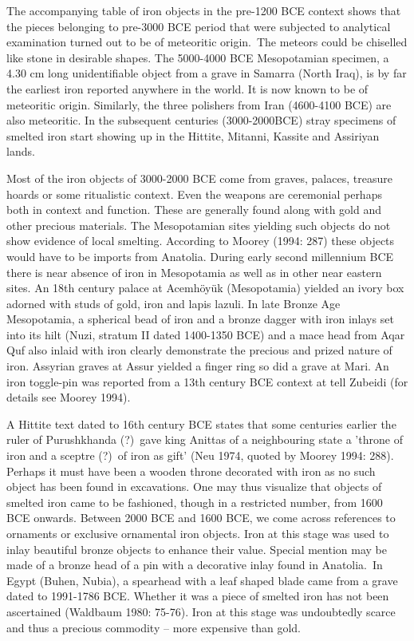 {The accompanying table of iron objects in the pre-1200 BCE context shows that the pieces belonging to pre-3000 BCE period that were subjected to analytical examination turned out to be of meteoritic origin.~The meteors could be chiselled like stone in desirable shapes. The 5000-4000 BCE Mesopotamian specimen, a 4.30 cm long unidentifiable object from a grave in Samarra (North Iraq), is by far the earliest iron reported anywhere in the world. It is now known to be of meteoritic origin. Similarly, the three polishers from Iran (4600-4100 BCE) are also meteoritic. In the subsequent centuries (3000-2000\newpage  BCE) stray specimens of smelted iron start showing up in the Hittite, Mitanni, Kassite and Assiriyan lands.

Most of the iron objects of 3000-2000 BCE come from graves, palaces, treasure hoards or some ritualistic context. Even the weapons are ceremonial perhaps both in context and function. These are generally found along with gold and other precious materials. The Mesopotamian sites yielding such objects do not show evidence of local smelting. According to Moorey (1994: 287) these objects would have to be imports from Anatolia. During early second millennium BCE there is near absence of iron in Mesopotamia as well as in other near eastern sites. An 18th century palace at Acemhöyük (Mesopotamia) yielded an ivory box adorned with studs of gold, iron and lapis lazuli. In late Bronze Age Mesopotamia, a spherical bead of iron and a bronze dagger with iron inlays set into its hilt (Nuzi, stratum II dated 1400-1350 BCE) and a mace head from Aqar Quf also inlaid with iron clearly demonstrate the precious and prized nature of iron. Assyrian graves at Assur yielded a finger ring so did a grave at Mari. An iron toggle-pin was reported from a 13th century BCE context at tell Zubeidi (for details see Moorey 1994).

A Hittite text dated to 16th century BCE states that some centuries earlier the ruler of Purushkhanda (?)~gave king Anittas of a neighbouring state a 'throne of iron and a sceptre (?)~of iron as gift' (Neu 1974, quoted by Moorey 1994: 288). Perhaps it must have been a wooden throne decorated with iron as no such object has been found in excavations. One may thus visualize that objects of smelted iron came to be fashioned, though in a restricted number, from 1600 BCE onwards. Between 2000 BCE and 1600 BCE, we come across references to ornaments or exclusive ornamental iron objects. Iron at this stage was used to inlay beautiful bronze objects to enhance their value. Special mention may be made of a bronze head of a pin with a decorative inlay found in Anatolia.~In Egypt (Buhen, Nubia), a spearhead with a leaf shaped blade came from a grave dated to 1991-1786 BCE. Whether it was a piece of smelted iron has not been ascertained (Waldbaum 1980: 75-76). Iron at this stage was undoubtedly scarce and thus a precious commodity – more expensive than gold. 

}
